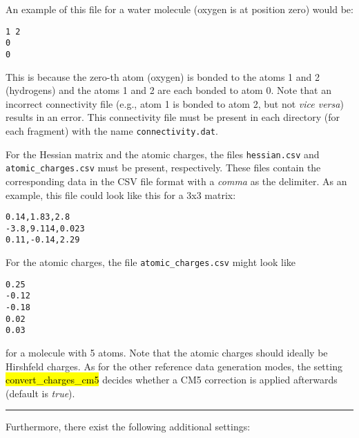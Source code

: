 \documentclass[]{tufte-book}
\begin{document}
{{An example of this file for a water molecule (oxygen is at position zero) would be:
\begin{mdframed}[backgroundcolor=LightSteelBlue!25, linewidth=0pt]
\begin{verbatim}
1 2
0
0
\end{verbatim}
\end{mdframed}
This is because the zero-th atom (oxygen) is bonded to the atoms 1 and 2 (hydrogens) and the atoms 1 and 2 are each bonded to atom 0. Note that an incorrect connectivity file (e.g., atom 1 is bonded to atom 2, but not \textit{vice versa}) results in an error. This connectivity file must be present in each directory (for each fragment) with the name \texttt{connectivity.dat}.

For the Hessian matrix and the atomic charges, the files \texttt{hessian.csv} and \texttt{atomic\_charges.csv} must be present, respectively. These files contain the corresponding data in the CSV file format with a \textit{comma} as the delimiter.
As an example, this file could look like this for a 3x3 matrix:
\begin{mdframed}[backgroundcolor=LightSteelBlue!25, linewidth=0pt]
\begin{verbatim}
0.14,1.83,2.8
-3.8,9.114,0.023
0.11,-0.14,2.29
\end{verbatim}
\end{mdframed}
For the atomic charges, the file \texttt{atomic\_charges.csv} might look like
\begin{mdframed}[backgroundcolor=LightSteelBlue!25, linewidth=0pt]
\begin{verbatim}
0.25
-0.12
-0.18
0.02
0.03
\end{verbatim}
\end{mdframed}
for a molecule with 5 atoms. Note that the atomic charges should ideally be Hirshfeld charges. As for the other reference data generation modes, the setting \hl{convert\_charges\_cm5} decides whether a CM5 correction is applied afterwards (default is \textit{true}).

\vspace{0.3cm}
\hrule
\vspace{0.3cm}

Furthermore, there exist the following additional settings:

}}
\end{document}
